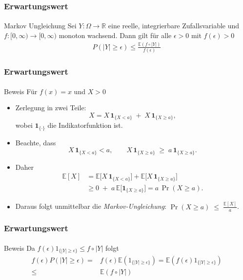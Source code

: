 \documentclass{beamer}
\begin{document}
\begin{frame}
    \frametitle{Erwartungswert}
\framesubtitle{}
\begin{block}{Markov Ungleichung}
Sei $Y : \Omega \to \mathbb{R}$  eine  reelle, integrierbare  Zufallsvariable und $f : [0, \infty) \to [0, \infty)$ monoton wachsend.
Dann gilt für alle $\epsilon > 0$ mit $f(\epsilon) > 0$
\begin{align*}
P (|Y |  \geq \epsilon) \leq \frac{\mathbb{E} (f \circ |Y|)}{f(\epsilon)}
\end{align*}
\end{block}

 \end{frame}


 \begin{frame}
    \frametitle{Erwartungswert}
\framesubtitle{}

\begin{block}{Beweis}
    Für $f(x)=x$ und $ X > 0$
\begin{itemize}
   
  \item Zerlegung in zwei Teile:
    \[
      X = X \,\mathbf{1}_{\{X<a\}} \;+\; X \,\mathbf{1}_{\{X\ge a\}},
    \]
    wobei $\mathbf{1}_{\{\cdot\}}$ die Indikatorfunktion ist.
  \item Beachte, dass
    \[
      X\,\mathbf{1}_{\{X<a\}} < a,
      \qquad
      X\,\mathbf{1}_{\{X\ge a\}} \;\ge\; a\,\mathbf{1}_{\{X\ge a\}}.
    \]
  \item Daher
    \[
      \begin{aligned}
        \mathbb{E}[X]
        &= \mathbb{E}\bigl[X\,\mathbf{1}_{\{X<a\}}\bigr]
         + \mathbb{E}\bigl[X\,\mathbf{1}_{\{X\ge a\}}\bigr] \\
        &\ge 0 \;+\; a\,\mathbb{E}\bigl[\mathbf{1}_{\{X\ge a\}}\bigr]
         = a\,\Pr(X \ge a).
      \end{aligned}
    \]
  \item Daraus folgt unmittelbar die \emph{Markov‐Ungleichung}:
      $\Pr(X \ge a) \;\le\; \frac{\mathbb{E}[X]}{a}$.
\end{itemize}
\end{block}
 \end{frame}


 \begin{frame}
    \frametitle{Erwartungswert}
\framesubtitle{}

\begin{block}{Beweis}
Da $f(\epsilon) 1_{\{ |Y| \geq  \epsilon \} } \leq f \circ |Y|$ folgt
\begin{align*}
f(\epsilon) P(|Y| \geq \epsilon) = & f(\epsilon) \mathbb{E}(1_{\{ |Y| \geq  \epsilon \} }) = \mathbb{E}( f(\epsilon) 1_{\{ |Y| \geq  \epsilon \} }) \\
\leq & \mathbb{E}( f \circ |Y|)
\end{align*}
\end{block}
 \end{frame}
\end{document}
